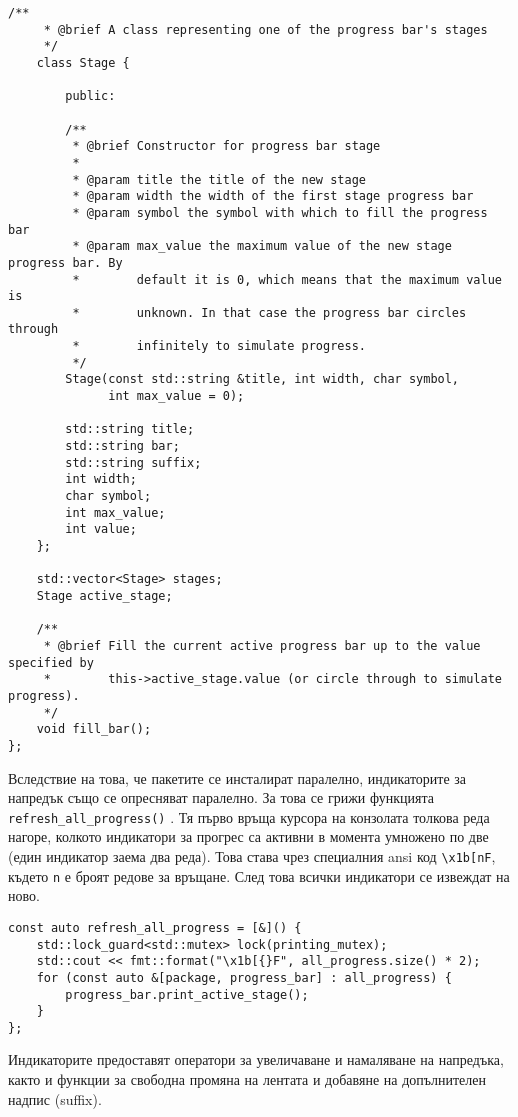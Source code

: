 \begin{lstlisting}[style=cpp,
				   caption=Класове за индикатор за напредък и етап,
				   label={lst:progress-bar}]
	/**
	 * @brief A class representing one of the progress bar's stages
	 */
	class Stage {

		public:

		/**
		 * @brief Constructor for progress bar stage
		 * 
		 * @param title the title of the new stage
		 * @param width the width of the first stage progress bar
		 * @param symbol the symbol with which to fill the progress bar
		 * @param max_value the maximum value of the new stage progress bar. By
		 * 		  default it is 0, which means that the maximum value is
		 * 		  unknown. In that case the progress bar circles through
		 * 		  infinitely to simulate progress.
		 */
		Stage(const std::string &title, int width, char symbol,
			  int max_value = 0);

		std::string title;
		std::string bar;
		std::string suffix;	
		int width;
		char symbol;
		int max_value;
		int value;
	};

	std::vector<Stage> stages;
	Stage active_stage;

	/**
	 * @brief Fill the current active progress bar up to the value specified by
	 * 		  this->active_stage.value (or circle through to simulate progress).
	 */
	void fill_bar();
};
\end{lstlisting}

Вследствие на това, че пакетите се инсталират паралелно, индикаторите за
напредък също се опресняват паралелно. За това се грижи функцията
\texttt{refresh\_all\_progress()} . Тя първо връща
курсора на конзолата толкова реда нагоре, колкото индикатори за прогрес са
активни в момента умножено по две (един индикатор заема два реда). Това става
чрез специалния \acrshort{ansi} код \texttt{\textbackslash x1b[nF}, където
\texttt{n} е броят редове за връщане. След това всички индикатори се извеждат на
ново.

\begin{lstlisting}[style=cpp,
				   caption=Функция за опресняване на всички индикатори,
				   label={lst:refresh-progress}]
const auto refresh_all_progress = [&]() {
	std::lock_guard<std::mutex> lock(printing_mutex);
	std::cout << fmt::format("\x1b[{}F", all_progress.size() * 2);
	for (const auto &[package, progress_bar] : all_progress) {
		progress_bar.print_active_stage();
	}
};
\end{lstlisting}

Индикаторите предоставят оператори за увеличаване и намаляване на напредъка,
както и функции за свободна промяна на лентата и добавяне на допълнителен надпис
(suffix).


